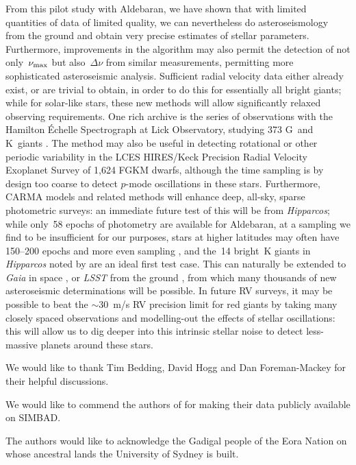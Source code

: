 \documentclass[modern]{aastex61}
\newcommand{\numax}{\mbox{$\nu_{\rm max}$}\xspace}
\newcommand{\Dnu}{\mbox{$\Delta \nu$}\xspace}
\newcommand{\hipparcos}{\emph{Hipparcos}\xspace}
\begin{document}
From this pilot study with Aldebaran, we have shown that with limited quantities of data of limited quality, we can nevertheless do asteroseismology from the ground and obtain very precise estimates of stellar parameters. Furthermore, improvements in the algorithm may also permit the detection of not only~\numax but also~\Dnu from similar measurements, permitting more sophisticated asteroseismic analysis. Sufficient radial velocity data either already exist, or are trivial to obtain, in order to do this for essentially all bright giants; while for solar-like stars, these new methods will allow significantly relaxed observing requirements. One rich archive is the series of observations with the Hamilton \'{E}chelle Spectrograph at Lick Observatory, studying 373 G~and K~giants \citep[e.g.][]{frink2001,hekker2006,ortiz2016}. The method may also be useful in detecting rotational or other periodic variability in the LCES HIRES/Keck Precision Radial Velocity Exoplanet Survey \citep{butler17} of 1,624 FGKM dwarfs, although the time sampling is by design too coarse to detect $p$-mode oscillations in these stars. Furthermore, CARMA models and related methods will enhance deep, all-sky, sparse photometric surveys: an immediate future test of this will be from \hipparcos; while only~58 epochs of photometry are available for Aldebaran, at a sampling we find to be insufficient for our purposes, stars at higher latitudes may often have 150--200 epochs and more even sampling \citep{hipparcos_phot}, and the~14 bright~K giants in \hipparcos noted by \citet{bedding2000} are an ideal first test case. This can naturally be extended to \emph{Gaia} in space \citep{gaia}, or \emph{LSST} from the ground \citep{dmt,lsst,lsstbook}, from which many thousands of new asteroseismic determinations will be possible. In future RV surveys, it may be possible to beat the \citet{2005PASJ...57...97S} $\sim 30$~m/s RV precision limit for red giants by taking many closely spaced observations and modelling-out the effects of stellar oscillations: this will allow us to dig deeper into this intrinsic stellar noise to detect less-massive planets around these stars.

\acknowledgments

We would like to thank Tim Bedding, David Hogg and Dan Foreman-Mackey for their helpful discussions.

We would like to commend the authors of \citet{Hatzes2015} for making their data
publicly available on SIMBAD.

The authors would like to acknowledge the Gadigal people of the Eora Nation on whose ancestral lands the University of Sydney is built.
\end{document}
